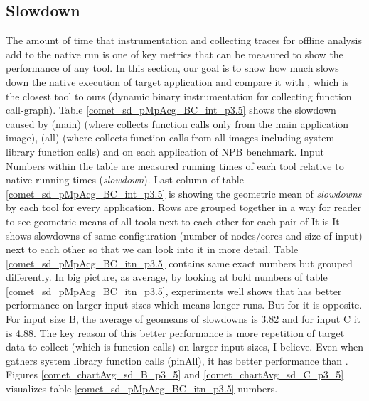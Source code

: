 









\subsection{Slowdown}

The amount of time that instrumentation and collecting traces for offline analysis add to the native run is one of key metrics that can be measured to show the performance of any tool. In this section, our goal is to show how much \parlot slows down the native execution of target application and compare it with \callgrind, which is the closest tool to ours (dynamic binary instrumentation for collecting function call-graph). 
Table \ref{comet_sd_pMpAcg_BC_int_p3.5} shows the slowdown caused by \parlot(main) (where \parlot collects function calls only from the main application image), \parlot(all) (where \parlot collects function calls from all images including system library function calls) and \callgrind on each application of NPB benchmark.
Input  Numbers within the table are measured running times of each tool relative to native running times (\textit{slowdown}). Last column of table \ref{comet_sd_pMpAcg_BC_int_p3.5} is showing the geometric mean of \textit{slowdowns} by each tool for every application. Rows are grouped together in a way for reader to see geometric means of all tools next to each other for each pair of 
It is  It shows slowdowns of same configuration (number of nodes/cores and size of input) next to each other so that we can look into it in more detail.
Table \ref{comet_sd_pMpAcg_BC_itn_p3.5} contains same exact numbers but grouped differently. In big picture, as average, by looking at bold numbers of table \ref{comet_sd_pMpAcg_BC_itn_p3.5}, experiments well shows that \parlot has better performance on larger input sizes which means longer runs. But for \callgrind it is opposite. For input size B, the average of geomeans of slowdowns is 3.82 and for input C it is 4.88. The key reason of this better performance is more repetition of target data to collect (which is function calls) on larger input sizes, I believe. Even when \parlot gathers system library function calls (pinAll), it has better performance than \callgrind. Figures \ref{comet_chartAvg_sd_B_p3_5} and \ref{comet_chartAvg_sd_C_p3_5} visualizes table \ref{comet_sd_pMpAcg_BC_itn_p3.5} numbers.


